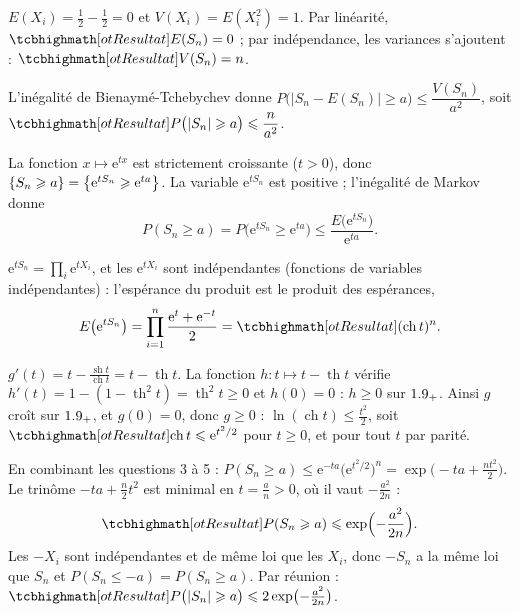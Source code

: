 
\enParties

\begin{corrigeEval}{}{}
\begin{questions}
  \item $E(X_i)=\frac12-\frac12=0$ et $V(X_i)=E(X_i^{2})=1$. Par linéarité,
    $\res{E(S_n)=0}$ ; par indépendance, les variances s'ajoutent :
    $\res{V(S_n)=n}$.
  \item L'inégalité de Bienaymé-Tchebychev donne
    $P\bigl(|S_n-E(S_n)|\geqslant a\bigr)\leqslant\dfrac{V(S_n)}{a^{2}}$,
    soit $\res{P\bigl(|S_n|\geqslant a\bigr)\leqslant\dfrac{n}{a^{2}}}$.
\end{questions}
\end{corrigeEval}

\begin{corrigeEval}{}{}
\begin{questions}[start=3]
  \item La fonction $x\mapsto\mathrm{e}^{tx}$ est strictement croissante
    ($t>0$), donc $\left\{S_n\geqslant a\right\}=\left\{\mathrm{e}^{tS_n}\geqslant\mathrm{e}^{ta}\right\}$.
    La variable $\mathrm{e}^{tS_n}$ est positive ; l'inégalité de Markov
    donne
    \[P(S_n\geqslant a)=P\bigl(\mathrm{e}^{tS_n}\geqslant\mathrm{e}^{ta}\bigr)
      \leqslant\frac{E\bigl(\mathrm{e}^{tS_n}\bigr)}{\mathrm{e}^{ta}}.\]
  \item $\mathrm{e}^{tS_n}=\prod_i\mathrm{e}^{tX_i}$, et les
    $\mathrm{e}^{tX_i}$ sont indépendantes (fonctions de variables
    indépendantes) : l'espérance du produit est le produit des espérances,
    \[E\bigl(\mathrm{e}^{tS_n}\bigr)=\prod_{i=1}^{n}\frac{\mathrm{e}^{t}+\mathrm{e}^{-t}}{2}
      =\res{(\operatorname{ch}t)^{n}}.\]
  \item $g'(t)=t-\frac{\operatorname{sh}t}{\operatorname{ch}t}=t-\operatorname{th}t$.
    La fonction $h:t\mapsto t-\operatorname{th}t$ vérifie
    $h'(t)=1-(1-\operatorname{th}^{2}t)=\operatorname{th}^{2}t\geqslant0$ et
    $h(0)=0$ : $h\geqslant0$ sur $1.9_{+}$. Ainsi $g$ croît sur $1.9_{+}$, et
    $g(0)=0$, donc $g\geqslant0$ : $\ln(\operatorname{ch}t)\leqslant\frac{t^{2}}2$,
    soit $\res{\operatorname{ch}t\leqslant\mathrm{e}^{t^{2}/2}}$ pour $t\geqslant0$,
    et pour tout $t$ par parité.
  \item En combinant les questions 3 à 5 :
    $P(S_n\geqslant a)\leqslant\mathrm{e}^{-ta}\bigl(\mathrm{e}^{t^{2}/2}\bigr)^{n}=\exp\bigl(-ta+\frac{nt^{2}}2\bigr)$.
    Le trinôme $-ta+\frac{n}{2}t^{2}$ est minimal en $t=\frac an>0$, où il vaut
    $-\frac{a^{2}}{2n}$ :
    \[\res{P(S_n\geqslant a)\leqslant\exp\Bigl(-\frac{a^{2}}{2n}\Bigr)}.\]
    Les $-X_i$ sont indépendantes et de même loi que les $X_i$, donc $-S_n$
    a la même loi que $S_n$ et $P(S_n\leqslant-a)=P(S_n\geqslant a)$. Par
    réunion :
    $\res{P\bigl(|S_n|\geqslant a\bigr)\leqslant2\exp\bigl(-\tfrac{a^{2}}{2n}\bigr)}$.
\end{questions}
\end{corrigeEval}

